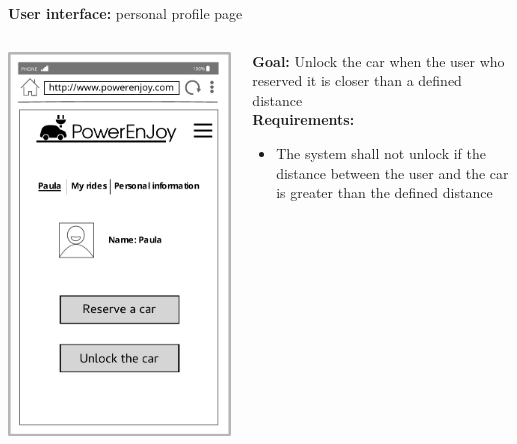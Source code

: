 \documentclass{beamer}
\begin{document}
	\begin{frame}{\textbf{User interface:} personal profile page}
	\begin{columns}
		\begin{column}{0.4\textwidth}
			\includegraphics[width=0.9\columnwidth]{figures/profile_page.pdf}
		\end{column}
		\begin{column}{0.5\textwidth}
			\textbf{Goal:} Unlock the car when the user who reserved it is closer than a defined distance\\
			\textbf{Requirements:}
			\begin{itemize}
				\item The system shall not unlock if the distance between the user and the car is greater than the defined distance
			\end{itemize} 
		\end{column}
	\end{columns}
	\end{frame}	
\end{document}
